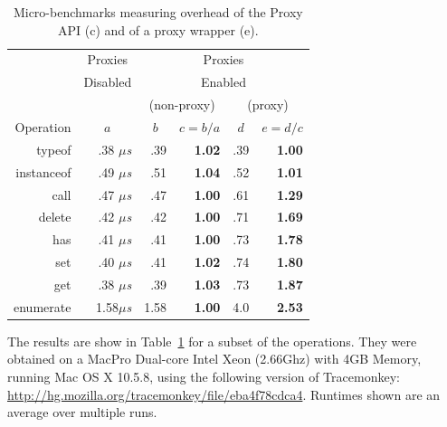 \documentclass{acm_proc_article-sp}
\begin{document}
\begin{table}
  \begin{center}
  \begin{tabular}{r|r|r|r|r|r}
              & \multicolumn{1}{|c|}{Proxies} & \multicolumn{4}{|c}{Proxies}\\
              & \multicolumn{1}{|c|}{Disabled} & \multicolumn{4}{|c}{Enabled}\\
    \hline
           &   & \multicolumn{2}{|c|}{(non-proxy)} & \multicolumn{2}{|c}{(proxy)}\\
           \cline{3-6}
 Operation & \multicolumn{1}{|c|}{$a$} & \multicolumn{1}{|c|}{$b$} & \multicolumn{1}{|c|}{$c=b/a$} & \multicolumn{1}{|c|}{$d$} & \multicolumn{1}{|c}{$e=d/c$}\\
    \hline
    typeof     & ~.38 $\mu$\emph{s} & .39 & \textbf{1.02} & .39 & \textbf{1.00}\\
    instanceof & ~.49 $\mu$\emph{s} & .51 & \textbf{1.04} & .52 & \textbf{1.01}\\
    call       & ~.47 $\mu$\emph{s} & .47 & \textbf{1.00} & .61 & \textbf{1.29}\\
    delete     & ~.42 $\mu$\emph{s} & .42 & \textbf{1.00} & .71 & \textbf{1.69}\\
    has        & ~.41 $\mu$\emph{s} & .41 & \textbf{1.00} & .73 & \textbf{1.78}\\
    set        & ~.40 $\mu$\emph{s} & .41 & \textbf{1.02} & .74 & \textbf{1.80}\\
    get        & ~.38 $\mu$\emph{s} & .39 & \textbf{1.03} & .73 & \textbf{1.87}\\
    enumerate  & 1.58$\mu$\emph{s} & 1.58 & \textbf{1.00} & 4.0 & \textbf{2.53}\\
  \end{tabular}
  \end{center}
  \caption{Micro-benchmarks measuring overhead of the Proxy API (c) and of a proxy wrapper (e).}
  \label{tab:benchmarks}
\end{table}

The results are show in Table~\ref{tab:benchmarks} for a subset of the operations. They were obtained on a MacPro Dual-core Intel Xeon (2.66Ghz) with 4GB Memory, running Mac OS X 10.5.8, using the following version of Tracemonkey: \url{http://hg.mozilla.org/tracemonkey/file/eba4f78cdca4}. Runtimes shown are an average over multiple runs.
\end{document}

